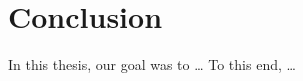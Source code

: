 \chapter{Conclusion}
\label{ch:Conclusion}

In this thesis, our goal was to \dots
To this end, \dots